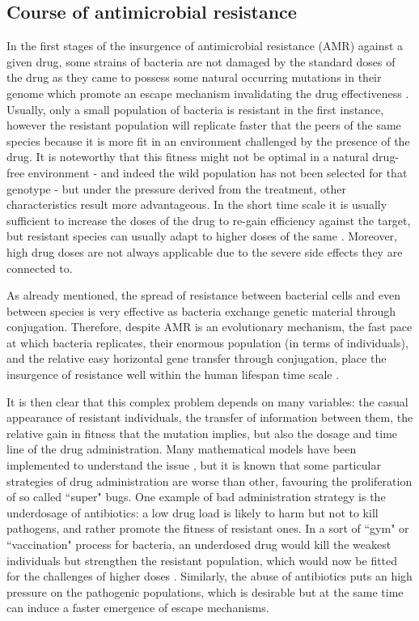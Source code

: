 \subsection{Course of antimicrobial resistance} \label{sec:course_AMR}
In the first stages of the insurgence of antimicrobial resistance (AMR) against a given drug, some strains of bacteria are not damaged by the standard doses of the drug as they came to possess some natural occurring mutations in their genome which promote an escape mechanism invalidating the drug effectiveness \cite{Kapoor2017,Blair2014}. Usually, only a small population of bacteria is resistant  in the first instance, however the resistant population will replicate faster that the peers of the same species because it is more fit in an environment challenged by the presence of the drug. It is noteworthy that this fitness might not be optimal in a natural drug-free environment - and indeed the wild population has not been selected for that genotype - but under the pressure derived from the treatment, other characteristics result more advantageous.
%
In the short time scale it is usually sufficient to increase the doses of the drug to re-gain efficiency against the target, but resistant species can usually adapt to higher doses of the same \cite{????}. Moreover, high drug doses are not always applicable due to the severe side effects they are connected to.

As already mentioned, the spread of resistance between bacterial cells and even between species is very effective as bacteria exchange genetic material through conjugation.
%
Therefore, despite AMR is an evolutionary mechanism, the fast pace at which bacteria replicates, their enormous population (in terms of individuals), and the relative easy horizontal gene transfer through conjugation, place the insurgence of resistance well within the human lifespan time scale \cite{????}.

It is then clear that this complex problem depends on many variables: the casual appearance of resistant individuals, the transfer of information between them, the relative gain in fitness that the mutation implies, but also the dosage and time line of the drug administration. Many mathematical models have been implemented to understand the issue \cite{Birkegard2018,Niewiadomska2019}, but it is known that some particular strategies of drug administration are worse than other, favouring the proliferation of so called ``super" bugs.
%
One example of bad administration strategy is the underdosage of antibiotics: a low drug load is likely to harm but not to kill pathogens, and rather promote the fitness of resistant ones. In a sort of ``gym" or ``vaccination" process for bacteria, an underdosed drug would kill the weakest individuals but strengthen the resistant population, which would now be fitted for the challenges of higher doses \cite{Oneill2016}.
%
Similarly, the abuse of antibiotics puts an high pressure on the pathogenic populations, which is desirable but at the same time can induce a faster emergence of escape mechanisms.

